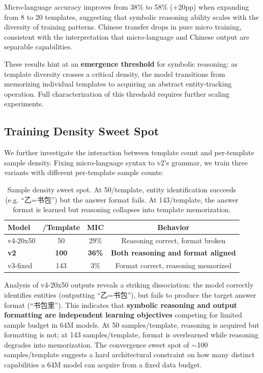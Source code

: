 \documentclass[11pt,a4paper]{article}
\begin{document}
Micro-language accuracy improves from 38\% to 58\% (+20pp) when expanding from 8 to 20 templates, suggesting that symbolic reasoning ability scales with the diversity of training patterns. Chinese transfer drops in pure micro training, consistent with the interpretation that micro-language and Chinese output are separable capabilities.

These results hint at an \textbf{emergence threshold} for symbolic reasoning: as template diversity crosses a critical density, the model transitions from memorizing individual templates to acquiring an abstract entity-tracking operation. Full characterization of this threshold requires further scaling experiments.

\subsection{Training Density Sweet Spot}

We further investigate the interaction between template count and per-template sample density. Fixing micro-language syntax to v2's grammar, we train three variants with different per-template sample counts:

\begin{table}[h]
\centering
\begin{tabular}{lccc}
\toprule
\textbf{Model} & \textbf{/Template} & \textbf{MIC} & \textbf{Behavior} \\
\midrule
v4-20x50 & 50 & 29\% & Reasoning correct, format broken \\
\textbf{v2} & \textbf{100} & \textbf{36\%} & \textbf{Both reasoning and format aligned} \\
v3-fixed & 143 & 3\% & Format correct, reasoning memorized \\
\bottomrule
\end{tabular}
\caption{Sample density sweet spot. At 50/template, entity identification succeeds (e.g. ``乙=书包'') but the answer format fails. At 143/template, the answer format is learned but reasoning collapses into template memorization.}
\label{tab:density}
\end{table}

Analysis of v4-20x50 outputs reveals a striking dissociation: the model correctly identifies entities (outputting ``乙=书包''), but fails to produce the target answer format (``书包里''). This indicates that \textbf{symbolic reasoning and output formatting are independent learning objectives} competing for limited sample budget in 64M models. At 50 samples/template, reasoning is acquired but formatting is not; at 143 samples/template, format is overlearned while reasoning degrades into memorization. The convergence sweet spot of $\sim$100 samples/template suggests a hard architectural constraint on how many distinct capabilities a 64M model can acquire from a fixed data budget.
\end{document}
